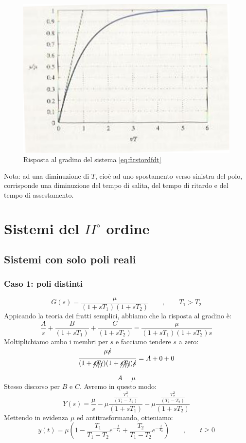 \documentclass[a4paper]{report}
\begin{document}
\begin{figure}[!h]
\begin{center}
\includegraphics[scale=0.5]{./figures/rispscal1.png}
\caption{Risposta al gradino del sistema \ref{eq:firstordfdt}}\label{fig:risp1}
\end{center}
\end{figure} 
Nota: ad una diminuzione di $T$, cio\`e ad uno spostamento verso
sinistra del polo, corrisponde una diminuzione del tempo di salita,
del tempo di ritardo e del tempo di assestamento.

\section{Sistemi del $II^{\circ}$ ordine}
\subsection{Sistemi con solo poli reali}
\subsubsection{Caso 1: poli distinti}
\begin{equation}\label{eq:secordfdt_c1}
  G(s) = \dfrac{\mu}{(1+sT_1)(1+sT_2)} \qquad, \qquad T_1>T_2
\end{equation}
Appicando la teoria dei fratti semplici\label{FrattiSemplici}, abbiamo che la risposta al gradino
\`e:
\[
  \dfrac{A}{s} + \dfrac{B}{(1 + sT_1)} + \dfrac{C}{(1 + sT_2)} =
  \dfrac{\mu}{(1 + sT_1)(1 + sT_2)s}
\]
Moltiplichiamo ambo i membri per $s$ e facciamo tendere $s$ a zero:
\[
  \dfrac{\mu \xout{s}}{(1 + \xout{sT_1})(1 + \xout{sT_2})\xout{s}} = A
  + 0 + 0
\]
\[
  A = \mu
\]
Stesso discorso per $B$ e $C$. Avremo in questo modo:
\[
  Y(s) = \dfrac{\mu}{s} - \mu \dfrac{\frac{T_1^2}{(T_1 - T_2)}}{(1 + sT_1)} -
  \mu \dfrac{\frac{T_2^2}{(T_1 - T_2)}}{(1 + sT_2)}
\]
Mettendo in evidenza $\mu$ ed antitrasformando, otteniamo:
\begin{equation}\label{eq:rispgradsec_c1}
  y(t) = \mu \left( 1 - \frac{T_1}{T_1-T_2} e^{-\frac{t}{T_1}} +
  \frac{T_2}{T_1-T_2} e^{-\frac{t}{T_2}} \right) \qquad, \qquad t \ge 0
\end{equation}
\end{document}
